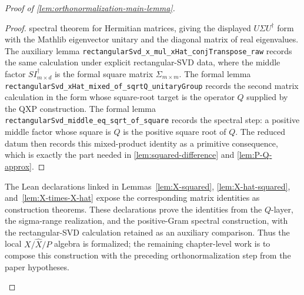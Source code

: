 \begin{proof}[Proof of \ref{lem:orthonormalization-main-lemma}]
\begin{proof}
		spectral theorem for Hermitian matrices, giving the displayed
		$U\Sigma U^\dagger$ form with the Mathlib eigenvector unitary and the
		diagonal matrix of real eigenvalues.  The auxiliary lemma
		\texttt{rectangularSvd\_x\_mul\_xHat\_conjTranspose\_raw} records the same
		calculation under explicit rectangular-SVD data, where the middle factor
		\(S I_{m\times d}^\dagger\) is the formal square matrix
		\(\Sigma_{m\times m}\).  The formal lemma
		\texttt{rectangularSvd\_xHat\_mixed\_of\_sqrtQ\_unitaryGroup} records the
		second matrix calculation in the form whose square-root target is the
		operator $Q$ supplied by the QXP construction.  The formal lemma
		\texttt{rectangularSvd\_middle\_eq\_sqrt\_of\_square} records the spectral
		step: a positive middle factor whose square is $Q$ is the positive square
		root of $Q$.  The reduced datum then records this mixed-product
		identity as a primitive consequence, which is exactly the part needed in
		\ref{lem:squared-difference} and \ref{lem:P-Q-approx}.
	\end{proof}

	\begin{remark}\label{rem:qxp-layer-lean-status}
		The Lean declarations linked in Lemmas~\ref{lem:X-squared},
		\ref{lem:X-hat-squared}, and~\ref{lem:X-times-X-hat} expose the
		corresponding matrix identities as construction theorems.  These
		declarations prove the identities from the \(Q\)-layer, the sigma-range
		realization, and the positive-Gram spectral construction, with the
		rectangular-SVD calculation retained as an auxiliary comparison.  Thus the
		local \(X/\widehat X/P\) algebra is formalized; the remaining chapter-level
		work is to compose this construction with the preceding orthonormalization
		step from the paper hypotheses.
	\end{remark}


\end{proof}
